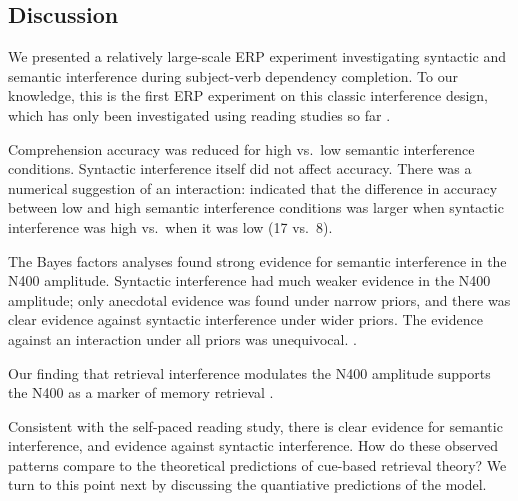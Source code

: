 \documentclass[a4paper, man, floatsintext]{apa7}
\begin{document}
\subsection{Discussion}
We presented a relatively large-scale ERP experiment investigating syntactic and semantic interference during subject-verb dependency completion. To our knowledge, this is the first ERP experiment on this classic interference design, which has only been investigated using reading studies so far \parencite{mertzen,vandyke07}. 

Comprehension accuracy was reduced for high vs.\ low semantic interference conditions. 
Syntactic interference itself did not affect accuracy. There was a numerical suggestion of an interaction: indicated that the difference in accuracy between low and high semantic interference conditions was larger when syntactic interference was high vs.\ when it was low (17 vs.\ 8). 

The Bayes factors analyses found strong evidence for semantic interference in the N400 amplitude. Syntactic interference had much weaker evidence in the N400 amplitude; only anecdotal evidence was found under narrow priors, and there was clear evidence against syntactic interference under wider priors. The evidence against an interaction under all priors was unequivocal. . 

Our finding that retrieval interference modulates the N400 amplitude supports the N400 as a marker of memory retrieval \citep{kutas&federmeier_2000, kutas_federmeier2011, brouwer2017_n4_p6, lau2008_n400}.

Consistent with the self-paced reading study, there is clear evidence for semantic interference, and evidence against syntactic interference.  How do these observed patterns compare to the theoretical predictions of cue-based retrieval theory? We turn to this point next by discussing the quantiative predictions of the \cite{Lewis2005} model.

\end{document}
